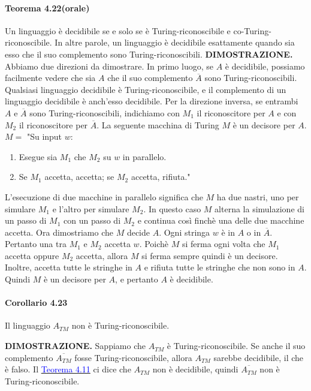 \documentclass{article}
\begin{document}
\paragraph{Teorema 4.22(orale)}
\label{teorema-4.22}
\text{}
\newline
Un linguaggio è decidibile se e solo se è Turing-riconoscibile e co-Turing-riconoscibile.
\newline
In altre parole, un linguaggio è decidibile esattamente quando sia esso che il suo complemento sono Turing-riconoscibili.
\vspace{1em}
\text{}
\newline
\hbox{\textbf{DIMOSTRAZIONE.}}
Abbiamo due direzioni da dimostrare.
In primo luogo, se $A$ è decidibile, possiamo facilmente vedere che sia $A$ che il suo complemento $\overline{A}$ sono Turing-riconoscibili.
Qualsiasi linguaggio decidibile è Turing-riconoscibile, e il complemento di un linguaggio decidibile è anch'esso decidibile.
Per la direzione inversa, se entrambi $A$ e $\overline{A}$ sono Turing-riconoscibili, indichiamo con $M_1$ il riconoscitore per $A$ e con $M_2$ il riconoscitore per $\overline{A}$.
La seguente macchina di Turing $M$ è un decisore per $A$.
\vspace{1em}
\text{}
\newline
$M = $ "Su input $w$:
\begin{enumerate}
    \item Esegue sia $M_1$ che $M_2$ su $w$ in parallelo.
    \item Se $M_1$ accetta, accetta; se $M_2$ accetta, rifiuta."
\end{enumerate}
L'esecuzione di due macchine in parallelo significa che $M$ ha due nastri, uno per simulare $M_1$ e l'altro per simulare $M_2$.
In questo caso $M$ alterna la simulazione di un passo di $M_1$ con un passo di $M_2$ e continua così finchè una delle due macchine accetta.
Ora dimostriamo che $M$ decide $A$.
Ogni stringa $w$ è in $A$ o in $\overline{A}$.
Pertanto una tra $M_1$ e $M_2$ accetta $w$.
Poichè $M$ si ferma ogni volta che $M_1$ accetta oppure $M_2$ accetta, allora $M$ si ferma sempre quindi è un decisore.
Inoltre, accetta tutte le stringhe in $A$ e rifiuta tutte le stringhe che non sono in $A$.
Quindi $M$ è un decisore per $A$, e pertanto $A$ è decidibile.
\newline
\paragraph*{Corollario 4.23}
\label{corollario-4.23}
\text{}
\newline
\begin{tcolorbox}[title=Corollario 4.23]
Il linguaggio $A_{TM}$ non è Turing-riconoscibile.
\end{tcolorbox}
\vspace{1em}
\text{}
\newline
\hbox{\textbf{DIMOSTRAZIONE.}}
Sappiamo che $A_{TM}$ è Turing-riconoscibile.
Se anche il suo complemento $\overline{A_{TM}}$ fosse Turing-riconoscibile, allora $A_{TM}$ sarebbe decidibile, il che è falso.
Il \hyperref[teorema-4.11]{\textcolor{blue}{Teorema 4.11}} ci dice che $A_{TM}$ non è decidibile, quindi $\overline{A_{TM}}$ non è Turing-riconoscibile.
\end{document}
